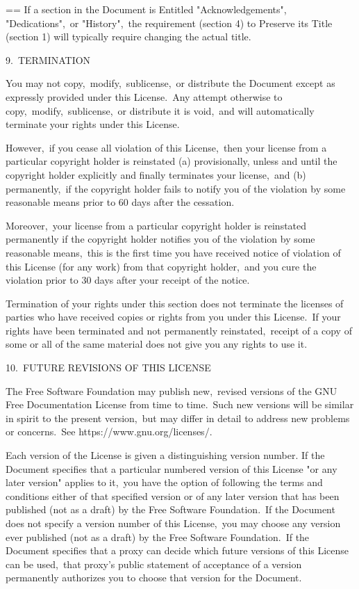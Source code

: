 \documentclass{book}
\makeatletter
\newenvironment{Texinfopreformatted}{%
  \par\GNUTobeylines\obeyspaces\frenchspacing\parskip=\z@\parindent=\z@}{}
{\catcode`\^^M=13 \gdef\GNUTobeylines{\catcode`\^^M=13 \def^^M{\null\par}}}
\newenvironment{Texinfoindented}{\begin{list}{}{}\item\relax}{\end{list}}
\renewcommand{\_}{\Texinfounderscore\discretionary{}{}{}}
\makeatother
\begin{document}
\begin{Texinfoindented}
\begin{Texinfopreformatted}
If a section in the Document is Entitled "Acknowledgements",
"Dedications",\ or "History",\ the requirement (section 4) to Preserve
its Title (section 1) will typically require changing the actual
title.


9.\ TERMINATION

You may not copy,\ modify,\ sublicense,\ or distribute the Document
except as expressly provided under this License.\  Any attempt
otherwise to copy,\ modify,\ sublicense,\ or distribute it is void,\ and
will automatically terminate your rights under this License.

However,\ if you cease all violation of this License,\ then your license
from a particular copyright holder is reinstated (a) provisionally,
unless and until the copyright holder explicitly and finally
terminates your license,\ and (b) permanently,\ if the copyright holder
fails to notify you of the violation by some reasonable means prior to
60 days after the cessation.

Moreover,\ your license from a particular copyright holder is
reinstated permanently if the copyright holder notifies you of the
violation by some reasonable means,\ this is the first time you have
received notice of violation of this License (for any work) from that
copyright holder,\ and you cure the violation prior to 30 days after
your receipt of the notice.

Termination of your rights under this section does not terminate the
licenses of parties who have received copies or rights from you under
this License.\  If your rights have been terminated and not permanently
reinstated,\ receipt of a copy of some or all of the same material does
not give you any rights to use it.


10.\ FUTURE REVISIONS OF THIS LICENSE

The Free Software Foundation may publish new,\ revised versions of the
GNU Free Documentation License from time to time.\  Such new versions
will be similar in spirit to the present version,\ but may differ in
detail to address new problems or concerns.\  See
https://www.gnu.org/licenses/.

Each version of the License is given a distinguishing version number.
If the Document specifies that a particular numbered version of this
License "or any later version" applies to it,\ you have the option of
following the terms and conditions either of that specified version or
of any later version that has been published (not as a draft) by the
Free Software Foundation.\  If the Document does not specify a version
number of this License,\ you may choose any version ever published (not
as a draft) by the Free Software Foundation.\  If the Document
specifies that a proxy can decide which future versions of this
License can be used,\ that proxy's public statement of acceptance of a
version permanently authorizes you to choose that version for the
Document.


\end{Texinfopreformatted}
\end{Texinfoindented}
\end{document}
